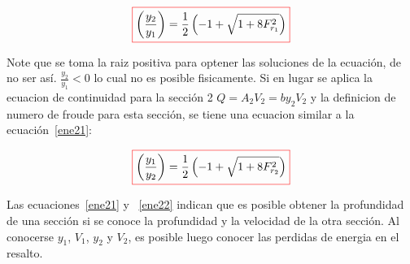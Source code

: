 \documentclass[11pt, oneside]{article}
\begin{document}
\begin{equation}
\color{red}\boxed{\color{black} \left( \frac{y_2}{y_1} \right) = \frac{1}{2} \left( -1 + \sqrt{1 + 8 F_{r_1}^2} \right)}
\label{ene21}
\end{equation}

Note que se toma la raiz positiva para optener las soluciones de la ecuaci\'on, de no ser as\'i. $\frac{y_2}{y_1} < 0$ lo cual no es posible fisicamente. Si en lugar se aplica la ecuacion de continuidad para la secci\'on 2 $Q=A_2 V_2 = by_2 V_2$ y la definicion de numero de froude para esta secci\'on, se tiene una ecuacion similar a la ecuaci\'on~\ref{ene21}:

\begin{equation}
\color{red}\boxed{\color{black} \left( \frac{y_1}{y_2} \right) = \frac{1}{2} \left( -1 + \sqrt{1 + 8 F_{r_2}^2} \right)}
\label{ene22}
\end{equation}

Las ecuaciones~\ref{ene21} y ~\ref{ene22} indican que es posible obtener la profundidad de una secci\'on si se conoce la profundidad y la velocidad de la otra secci\'on. Al conocerse $y_1$, $V_1$, $y_2$ y $V_2$, es posible luego conocer las perdidas de energia en el resalto.
\end{document}
